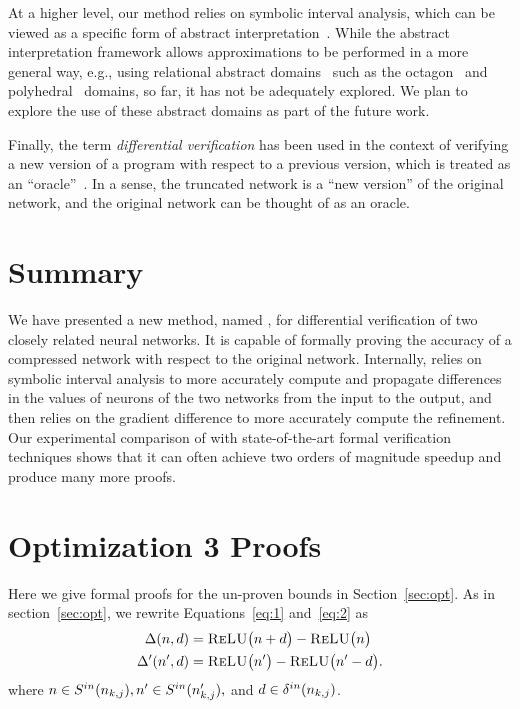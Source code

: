 At a higher level, our method relies on symbolic interval analysis,
which can be viewed as a specific form of abstract
interpretation~\cite{CousotC77}.  While the abstract interpretation
framework allows approximations to be performed in a more general way,
e.g., using relational abstract domains~\cite{Mine04} such as the
octagon~\cite{Mine01} and polyhedral~\cite{CousotH78} domains, so far,
it has not be adequately explored.  We plan to explore the use of
these abstract domains as part
of the future work.



Finally, the term \textit{differential verification} has been used
in the context of verifying a new version of a program with
respect to a previous version, which is treated as an ``oracle''~\cite{DAC13}.
In a sense, the truncated network is a ``new version'' of the original
network, and the original network can be thought of as an oracle.



\section{Summary}
\label{sec:conclusion}

We have presented a new method, named \diffNN{}, for differential
verification of two closely related neural networks.  It is capable of
formally proving the accuracy of a compressed network with respect to
the original network.  Internally, \diffNN{} relies on symbolic
interval analysis to more accurately compute and propagate differences
in the values of neurons of the two networks from the input to the
output, and then relies on the gradient difference to more accurately
compute the refinement.  Our experimental comparison of \diffNN{} with
state-of-the-art formal verification techniques shows that it can often
achieve two orders of magnitude speedup and produce many more proofs.


\section{Optimization 3 Proofs}
Here we give formal proofs for the un-proven bounds in Section~\ref{sec:opt}.
As in section~\ref{sec:opt}, we rewrite Equations~\ref{eq:1} and~\ref{eq:2} as
\begin{align*}
\Delta(n,d) & = \textsc{ReLU}\big(n + d\big) - \textsc{ReLU}\big(n\big)\\
\Delta'(n', d) & = \textsc{ReLU}\big(n'\big) - \textsc{ReLU}\big(n' - d\big).
\end{align*}
where $ n \in S^{in}(n_{k,j}), n' \in S^{in}(n'_{k,j}), $ and $ d \in \delta^{in}(n_{k,j}) $.

